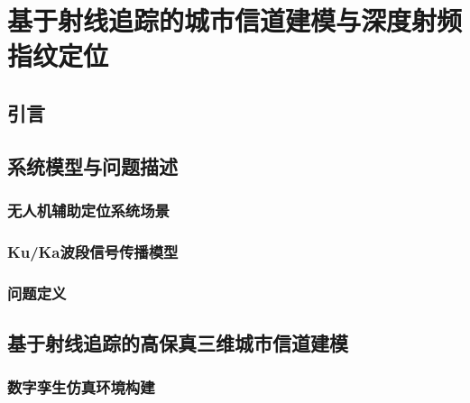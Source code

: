 \chapter{基于射线追踪的城市信道建模与深度射频指纹定位}

\section{引言}


\section{系统模型与问题描述}

\subsection{无人机辅助定位系统场景}


\subsection{Ku/Ka波段信号传播模型}


\subsection{问题定义}


\section{基于射线追踪的高保真三维城市信道建模}

\subsection{数字孪生仿真环境构建}


